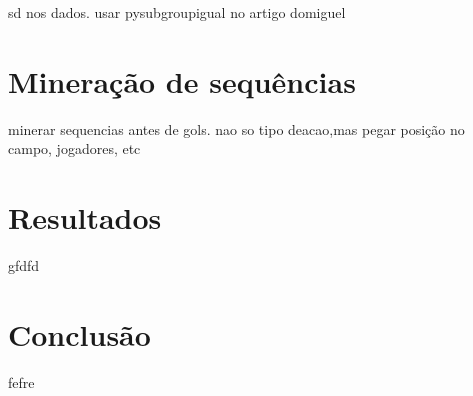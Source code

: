 \documentclass{article}
\begin{document}
sd nos dados. usar pysubgroupigual no artigo domiguel

\section{Mineração de sequências}

minerar sequencias antes de gols. nao so tipo deacao,mas pegar posição no campo, jogadores, etc

\section{Resultados}

gfdfd

\section{Conclusão}

fefre

\newpage

\renewcommand{\refname}{Referências Bibliográficas}

\nocite{*}
\end{document}
